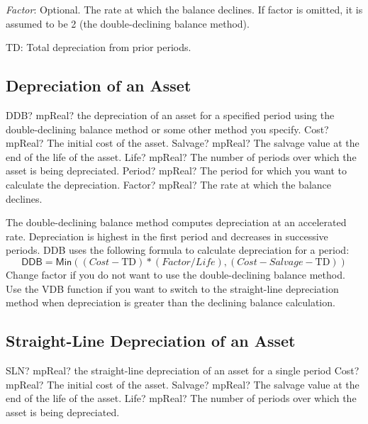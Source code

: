 \textit{Factor}: Optional. The rate at which the balance declines. If factor is omitted, it is assumed to be 2 (the double-declining balance method).

TD: Total depreciation from prior periods.



\subsection{Depreciation of an Asset}


\begin{mpFunctionsExtract}
	\mpWorksheetFunctionFiveNotImplemented
	{DDB? mpReal? the depreciation of an asset for a specified period using the double-declining balance method or some other method you specify.}
	{Cost? mpReal?  The initial cost of the asset.}
	{Salvage? mpReal? The salvage value at the end of the life of the asset.}
	{Life? mpReal? The number of periods over which the asset is being depreciated.}
	{Period? mpReal? The period for which you want to calculate the depreciation.}
	{Factor? mpReal? The rate at which the balance declines.}
\end{mpFunctionsExtract}


\vspace{0.3cm}
The double-declining balance method computes depreciation at an accelerated rate. Depreciation is highest in the first period and decreases in successive periods. DDB uses the following formula to calculate depreciation for a period: 
\begin{equation}
\textsf{DDB} = \textsf{Min}\left((\textit{Cost} - \text{TD}) * (\textit{Factor}/\textit{Life}), (\textit{Cost}-\textit{Salvage}-\text{TD})\right)
\end{equation}
Change factor if you do not want to use the double-declining balance method.
Use the \textsf{VDB} function if you want to switch to the straight-line depreciation method when depreciation is greater than the declining balance calculation.



\subsection{Straight-Line Depreciation of an Asset}

\begin{mpFunctionsExtract}
	\mpWorksheetFunctionThreeNotImplemented
	{SLN? mpReal? the straight-line depreciation of an asset for a single period}
	{Cost? mpReal?  The initial cost of the asset.}
	{Salvage? mpReal? The salvage value at the end of the life of the asset.}
	{Life? mpReal? The number of periods over which the asset is being depreciated.}
\end{mpFunctionsExtract}

